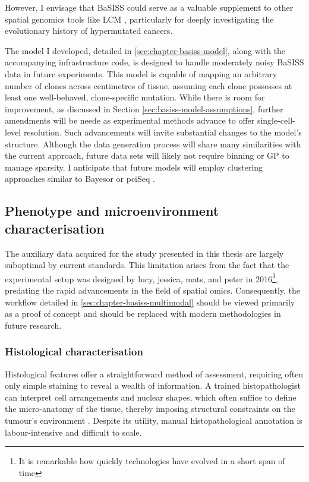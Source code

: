 However, I envisage that \ac{BaSISS} could serve as a valuable supplement to other spatial genomics tools like \ac{LCM} , particularly for deeply investigating the evolutionary history of hypermutated cancers.

The model I developed, detailed in \cref{sec:chapter-basiss-model}, along with the accompanying infrastructure code, is designed to handle moderately noisy \ac{BaSISS} data in future experiments. This model is capable of mapping an arbitrary number of clones across centimetres of tissue, assuming each clone possesses at least one well-behaved, clone-specific mutation. While there is room for improvement, as discussed in Section \cref{sec:basiss-model-assumptions}, further amendments will be neede as experimental methods advance to offer single-cell-level resolution. Such advancements will invite substantial changes to the model's structure. Although the data generation process will share many similarities with the current approach, future data sets will likely not require binning or \ac{GP} to manage sparsity. I anticipate that future models will employ clustering approaches similar to Bayesor \parencite{Petukhov2022-pv} or pciSeq \parencite{Qian2020-mp}.

\subsection{Phenotype and microenvironment characterisation}

The auxiliary data acquired for the study presented in this thesis are largely suboptimal by current standards. This limitation arises from the fact that the experimental setup was designed by \ac{lucy}, \ac{jessica}, \ac{mats}, and \ac{peter} in 2016\footnote{It is remarkable how quickly technologies have evolved in a short span of time}, predating the rapid advancements in the field of spatial omics. Consequently, the workflow detailed in \cref{sec:chapter-basiss-multimodal} should be viewed primarily as a proof of concept and should be replaced with modern methodologies in future research.

\subsubsection*{Histological characterisation}

Histological features offer a straightforward method of assessment, requiring often only simple staining to reveal a wealth of information. A trained histopathologist can interpret cell arrangements and nuclear shapes, which often suffice to define the micro-anatomy of the tissue, thereby imposing structural constraints on the tumour's environment . Despite its utility, manual histopathological annotation is labour-intensive and difficult to scale.

